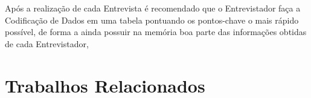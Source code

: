 
Após a realização de cada Entrevista é recomendado que o Entrevistador faça a Codificação de Dados em uma tabela pontuando os pontos-chave o mais rápido possível, de forma a ainda possuir na memória
boa parte das informações obtidas de cada Entrevistador,

\section{Trabalhos Relacionados}
\label{section:trabalhos_relacionados}